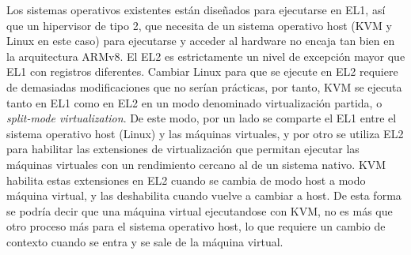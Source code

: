 Los sistemas operativos existentes están diseñados para ejecutarse en EL1, así que un hipervisor de tipo 2, que necesita de un sistema operativo host (KVM y Linux en este caso) para ejecutarse y acceder al hardware
no encaja tan bien en la arquitectura ARMv8. El EL2 es estrictamente un nivel de excepción mayor que EL1 con registros diferentes. Cambiar Linux para que se ejecute en EL2 requiere de demasiadas modificaciones que no serían prácticas, por tanto, KVM se ejecuta tanto en EL1 como en EL2 en un modo denominado virtualización partida, o \textit{split-mode virtualization}. De este modo, por un lado se comparte el EL1 entre el sistema operativo host (Linux) y las máquinas virtuales, y por otro se utiliza EL2 para habilitar las extensiones de virtualización que permitan ejecutar las máquinas virtuales con un rendimiento cercano al de un sistema nativo. KVM habilita estas extensiones en EL2 cuando se cambia de modo host a modo máquina virtual, y las deshabilita cuando vuelve a cambiar a host. De esta forma se podría decir que una máquina virtual ejecutandose con KVM, no es más que otro proceso más para el sistema operativo host, lo que requiere un cambio de contexto cuando se entra y se sale de la máquina virtual.\\


